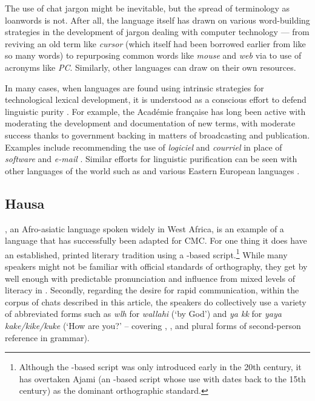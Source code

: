 \documentclass[output=paper,newtxmath,modfonts,nonflat,hidelinks]{langsci/langscibook}
\begin{document}
The use of chat jargon might be inevitable, but the spread of terminology as loanwords is not. After all, the  language itself has drawn on various word-building strategies in the development of jargon dealing with computer technology — from reviving an old term like \textit{cursor} (which itself had been borrowed earlier from  like so many  words) to repurposing common words like \textit{mouse} and \textit{web} via  to use of acronyms like \textit{PC}. Similarly, other languages can draw on their own resources.

In many cases, when languages are found using intrinsic strategies for technological lexical development, it is understood as a conscious effort to defend linguistic purity \citep{blommaert2002,haspelmath2009}. For example, the Académie française has long been active with moderating the development and documentation of new  terms, with moderate success thanks to government backing in matters of broadcasting and publication. Examples include recommending the use of \textit{logiciel} and \textit{courriel} in place of \textit{software} and \textit{e-mail} \citep{daulton2012}. Similar efforts for linguistic purification can be seen with other languages of the world such as  and various Eastern European languages \citep{haspelmath2009}.

\subsection{Hausa}

, an Afro-asiatic language spoken widely in West Africa, is an example of a language that has successfully been adapted for CMC. For one thing it does have an established, printed literary tradition using a -based script.\footnote{Although the -based script was only introduced early in the 20th century, it has overtaken Ajami (an -based script whose use with  dates back to the 15th century) as the dominant orthographic standard.}  While many speakers might not be familiar with official standards of orthography, they get by well enough with predictable pronunciation and influence from mixed levels of literacy in . Secondly, regarding the desire for rapid communication, within the corpus of  chats described in this article, the  speakers do collectively use a variety of abbreviated forms such as \textit{wlh} for \textit{wallahi} (‘by God’) and \textit{ya kk} for \textit{yaya kake/kike/kuke} (‘How are you?’ – covering , , and plural forms of second-person reference in  grammar).
\end{document}
